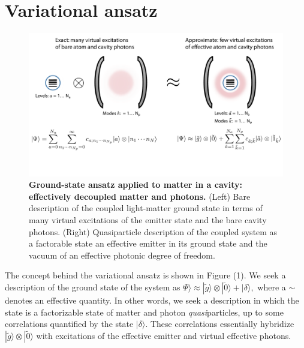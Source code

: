 \documentclass[aps,prb,twocolumn,
	groupedaddress,superscriptaddress,
	amsfonts,amssymb,amsmath,floatfix,
	citeautoscript]{revtex4-1}
\begin{document}
\section{Variational ansatz}
\begin{figure}[t]
\includegraphics[width=16cm]{conceptfigure.pdf}
\caption{\textbf{Ground-state ansatz applied to matter in a cavity: effectively decoupled matter and photons.} (Left) Bare description of the coupled light-matter ground state in terms of many virtual excitations of the emitter state and the bare cavity photons. (Right) Quasiparticle description of the coupled system as a factorable state an effective emitter in its ground state and the vacuum of an effective photonic degree of freedom.}
\label{fig:ansatz}
\end{figure}

The concept behind the variational ansatz is shown in Figure (1). We seek a description of the ground state of the system as $\Psi\rangle \approx |\tilde{g}\rangle\otimes|\tilde{0}\rangle + |\delta\rangle,$ where a $\sim$ denotes an effective quantity. In other words, we seek a description in which the state is a factorizable state of matter and photon \textit{quasi}particles, up to some correlations quantified by the state $|\delta\rangle$. These correlations essentially hybridize $|\tilde{g}\rangle\otimes|\tilde{0}\rangle$ with excitations of the effective emitter and virtual effective photons. 
\end{document}
